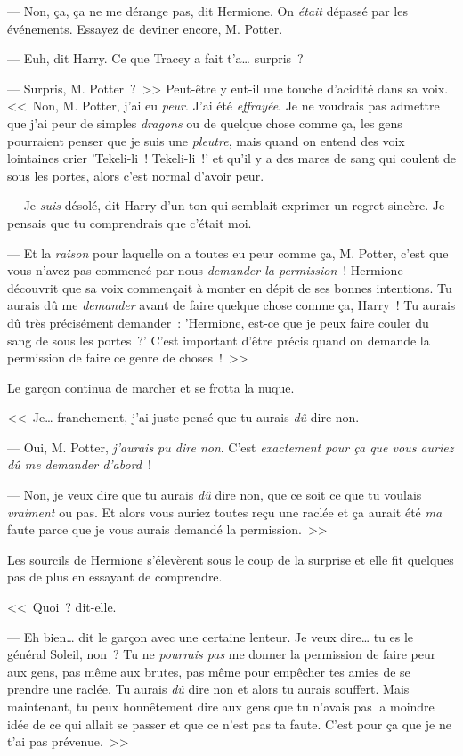 --- Non, ça, ça ne me dérange pas, dit Hermione. On \emph{était} dépassé par les événements. Essayez de deviner encore, M. Potter.

--- Euh, dit Harry. Ce que Tracey a fait t'a… surpris~?

--- Surpris, M. Potter~?~>> Peut-être y eut-il une touche d'acidité dans sa voix. <<~Non, M. Potter, j'ai eu \emph{peur}. J'ai été \emph{effrayée}. Je ne voudrais pas admettre que j'ai peur de simples \emph{dragons} ou de quelque chose comme ça, les gens pourraient penser que je suis une \emph{pleutre}, mais quand on entend des voix lointaines crier 'Tekeli-li~! Tekeli-li~!' et qu'il y a des mares de sang qui coulent de sous les portes, alors c'est normal d'avoir peur.

--- Je \emph{suis} désolé, dit Harry d'un ton qui semblait exprimer un regret sincère. Je pensais que tu comprendrais que c'était moi.

--- Et la \emph{raison} pour laquelle on a toutes eu peur comme ça, M. Potter, c'est que vous n'avez pas commencé par nous \emph{demander la permission}~! Hermione découvrit que sa voix commençait à monter en dépit de ses bonnes intentions. Tu aurais dû me \emph{demander} avant de faire quelque chose comme ça, Harry~! Tu aurais dû très précisément demander~: 'Hermione, est-ce que je peux faire couler du sang de sous les portes~?' C'est important d'être précis quand on demande la permission de faire ce genre de choses~!~>>

Le garçon continua de marcher et se frotta la nuque.

<<~Je… franchement, j'ai juste pensé que tu aurais \emph{dû} dire non.

--- Oui, M. Potter, \emph{j'aurais pu dire non}. C'est \emph{exactement pour ça que vous auriez dû me demander d'abord}~!

--- Non, je veux dire que tu aurais \emph{dû} dire non, que ce soit ce que tu voulais \emph{vraiment} ou pas. Et alors vous auriez toutes reçu une raclée et ça aurait été \emph{ma} faute parce que je vous aurais demandé la permission.~>>

Les sourcils de Hermione s'élevèrent sous le coup de la surprise et elle fit quelques pas de plus en essayant de comprendre.

<<~Quoi~? dit-elle.

--- Eh bien… dit le garçon avec une certaine lenteur. Je veux dire… tu es le général Soleil, non~? Tu ne \emph{pourrais pas} me donner la permission de faire peur aux gens, pas même aux brutes, pas même pour empêcher tes amies de se prendre une raclée. Tu aurais \emph{dû} dire non et alors tu aurais souffert. Mais maintenant, tu peux honnêtement dire aux gens que tu n'avais pas la moindre idée de ce qui allait se passer et que ce n'est pas ta faute. C'est pour ça que je ne t'ai pas prévenue.~>>

